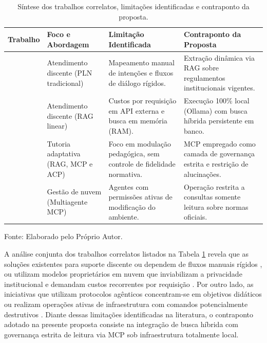 \documentclass[12pt]{article}
\begin{document}
\begin{table}[!htb]
\centering
\caption{Síntese dos trabalhos correlatos, limitações identificadas e contraponto da proposta.}
\label{tab:trabalhos_relacionados}
\vspace{0.3cm}
\footnotesize
\setlength{\tabcolsep}{5pt}
\renewcommand{\arraystretch}{1.2}

\begin{tabularx}{\textwidth}{
  >{\RaggedRight\hsize=0.68\hsize}X
  >{\RaggedRight\hsize=0.92\hsize}X
  >{\RaggedRight\hsize=1.20\hsize}X
  >{\RaggedRight\arraybackslash\hsize=1.20\hsize}X
}
\toprule
\textbf{Trabalho} & \textbf{Foco e Abordagem} & \textbf{Limitação Identificada} & \textbf{Contraponto da Proposta} \\
\midrule
\cite{monteiro2021helena}      & Atendimento discente (PLN tradicional)     & Mapeamento manual de intenções e fluxos de diálogo rígidos. & Extração dinâmica via RAG sobre regulamentos institucionais vigentes. \\
\cite{barbosa2023chatbot}      & Atendimento discente (RAG linear)          & Custos por requisição em API externa e busca em memória (RAM). & Execução 100\% local (Ollama) com busca híbrida persistente em banco. \\
\cite{modran2025leveraging}    & Tutoria adaptativa (RAG, MCP e ACP)        & Foco em modulação pedagógica, sem controle de fidelidade normativa. & MCP empregado como camada de governança estrita e restrição de alucinações. \\
\cite{oliveira2025arquitetura} & Gestão de nuvem (Multiagente MCP)          & Agentes com permissões ativas de modificação do ambiente. & Operação restrita a consultas somente leitura sobre normas oficiais. \\
\bottomrule
\end{tabularx}

\vspace{0.15cm}
{\small Fonte: Elaborado pelo Próprio Autor.}
\end{table}

A análise conjunta dos trabalhos correlatos listados na Tabela \ref{tab:trabalhos_relacionados} revela que as soluções existentes para suporte discente ou dependem de fluxos manuais rígidos \cite{monteiro2021helena}, ou utilizam modelos proprietários em nuvem que inviabilizam a privacidade institucional e demandam custos recorrentes por requisição \cite{barbosa2023chatbot}. Por outro lado, as iniciativas que utilizam protocolos agênticos concentram-se em objetivos didáticos \cite{modran2025leveraging} ou realizam operações ativas de infraestrutura com comandos potencialmente destrutivos \cite{oliveira2025arquitetura}. Diante dessas limitações identificadas na literatura, o contraponto adotado na presente proposta consiste na integração de busca híbrida com governança estrita de leitura via MCP sob infraestrutura totalmente local.
\end{document}
